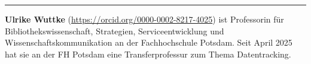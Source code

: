 \begin{center}\rule{0.5\linewidth}{0.5pt}\end{center}

\textbf{Ulrike Wuttke} (\url{https://orcid.org/0000-0002-8217-4025}) ist
Professorin für Bibliothekswissenschaft, Strategien, Serviceentwicklung
und Wissenschaftskommunikation an der Fachhochschule Potsdam. Seit April
2025 hat sie an der FH Potsdam eine Transferprofessur zum Thema
Datentracking.
